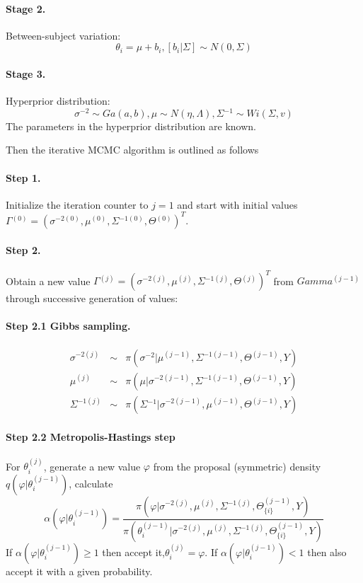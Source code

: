 \documentclass[12pt]{extarticle}
\begin{document}
\paragraph{Stage 2.}
Between-subject variation:
\begin{equation}
\theta_{i}=\mu+b_{i}, [b_{i}|\Sigma]\sim{}N(0,\Sigma)
\end{equation}
\paragraph{Stage 3.}
Hyperprior distribution:
\begin{equation}
\sigma^{-2}\sim{}Ga(a,b), \mu\sim{}N(\eta,\Lambda), \Sigma{}^{-1}\sim{}Wi(\Sigma,v)
\end{equation}
The parameters in the hyperprior distribution are known.

Then the iterative MCMC algorithm is outlined as follows

\paragraph{Step 1.}
Initialize the iteration counter to $j=1$ and start with initial values $\Gamma{}^{(0)}=(\sigma{}^{-2(0)},\mu{}^{(0)},\Sigma{}^{-1(0)},\Theta{}^{(0)})^{T}$.
\paragraph{Step 2.}
Obtain a new value  $\Gamma{}^{(j)}=(\sigma{}^{-2(j)},\mu{}^{(j)},\Sigma{}^{-1(j)},\Theta{}^{(j)})^{T}$ from $Gamma{}^{(j-1)}$ through successive generation of values:
\paragraph{Step 2.1 Gibbs sampling.}
\begin{equation}
\begin{array}{rcl}
\sigma{}^{-2(j)} & \sim{} & \pi{}(\sigma^{-2}|\mu{}^{(j-1)},\Sigma{}^{-1(j-1)},\Theta{}^{(j-1)},Y) \\
\mu{}^{(j)} & \sim{} & \pi{}(\mu{}|\sigma{}^{-2(j-1)},\Sigma{}^{-1(j-1)},\Theta{}^{(j-1)},Y) \\
\Sigma{}^{-1(j)} & \sim{} & \pi{}(\Sigma{}^{-1}|\sigma{}^{-2(j-1)},\mu{}^{(j-1)},\Theta{}^{(j-1)},Y)
\end{array}
\end{equation}
\paragraph{Step 2.2 Metropolis-Hastings step}
For $\theta{}_{i}^{(j)}$, generate a new value $\varphi$ from the proposal (symmetric) density $q(\varphi{}|\theta{}_{i}^{(j-1)})$, calculate
\begin{equation}
\alpha{}(\varphi{}|\theta{}_{i}^{(j-1)})=\frac{\pi{}(\varphi{}|\sigma{}^{-2(j)},\mu{}^{(j)},\Sigma{}^{-1(j)},\Theta{}_{\{i\}}^{(j-1)},Y)}{\pi{}(\theta{}_{i}^{(j-1)}|\sigma{}^{-2(j)},\mu{}^{(j)},\Sigma{}^{-1(j)},\Theta{}_{\{i\}}^{(j-1)},Y)}
\end{equation}
If $\alpha{}(\varphi{}|\theta{}_{i}^{(j-1)})\ge{}1$ then accept it,$\theta{}_{i}^{(j)}=\varphi{}$. If $\alpha{}(\varphi{}|\theta{}_{i}^{(j-1)})<1$ then also accept it with a given probability.
\end{document}
